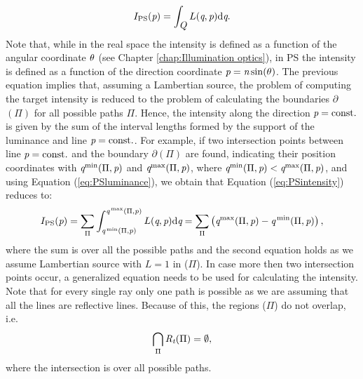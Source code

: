 \begin{equation}
\label{eq:PSintensity}
I_{\textrm{PS}}(\textit{p}) = \int_{\mbox{$\emph{Q}_{\textit{}}$}}L(\textit{q}, \textit{p}) \textrm{d}\textit{q}.
\end{equation}
Note that, while in the real space the intensity is defined as a function of the angular coordinate $\theta$ (see Chapter \ref{chap:Illumination optics}), in PS the intensity is defined as a function of the direction coordinate $\textit{p}=\textit{n}\sin(\theta)$.
The previous equation implies that, assuming a Lambertian source, the problem of computing the target intensity is reduced to the problem of calculating the boundaries
$\partial$$(\Pi)$ for all possible paths $\Pi$. Hence, the intensity along the direction $\textit{p}= \textrm{const.}$ is given by the sum of the interval lengths formed by the support of the luminance and line $\textit{p}=\textrm{const.}$. For example, if two intersection points between line $\textit{p}= \textrm{const.}$ and the boundary $\partial$$(\Pi)$ are found, indicating their position coordinates with $\textit{q}^\textrm{min}(\Pi,\textit{p})$ and $\textit{q}^\textrm{max}(\Pi,\textit{p})$, where $\textit{q}^\textrm{min}(\Pi,\textit{p})<\textit{q}^\textrm{max}(\Pi,\textit{p})$, and using Equation (\ref{eq:PSluminance}), we obtain that Equation (\ref{eq:PSintensity}) reduces to:
\begin{equation}\label{eta2}
I_{\textrm{PS}}(\textit{p}) = \sum_{\Pi}\int_{\textit{q}^\textrm{\,min}(\Pi, \textit{p})}^{\textit{q}^\textrm{\,max}(\Pi,\textit{p})}L(\textit{q}, \textit{p})\textrm{d}\textit{q} = \sum_{\Pi}\big (\textit{q}^\textrm{max}(\Pi,\textit{p})-\textit{q}^\textrm{\,min}(\Pi,\textit{p})\big )\,,
\end{equation}
where the sum is over all the possible paths and the second equation holds as we assume Lambertian source with $L=1$ in ($\Pi$). In case more then two intersection points occur, a generalized equation needs to be used for calculating the intensity. 
Note that for every single ray only one path is possible as we are assuming that all the lines are reflective lines.
Because of this, the regions ($\Pi$) do not overlap, i.e.
\begin{equation}
\bigcap_{\Pi}\mbox{$\emph{R}_{\textit{\textrm{t}}}$}(\Pi)= \emptyset,
\end{equation}
where the intersection is over all possible paths. \\ \indent
